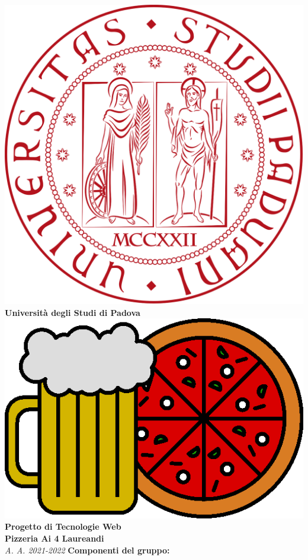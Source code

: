 \begin{center}
	\includegraphics[scale=0.05]{resources/logo_unipd.png}\\
	\bigskip
	\textbf{Università degli Studi di Padova}\\
	\vfill
	\includegraphics[scale=0.275]{resources/logo.png}
	\vfill
	\huge 
	\textbf{Progetto di Tecnologie Web\\Pizzeria Ai 4 Laureandi}\\
	\bigskip
	\large
	\textit{A. A. 2021-2022}
	\vfill
	\textbf{Componenti del gruppo:}\\

\end{center}
